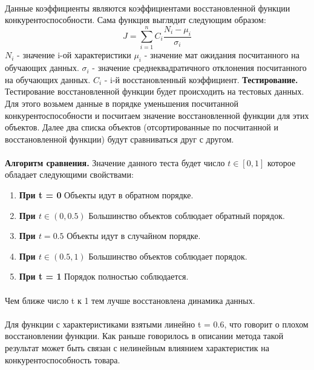 \documentclass[14pt, a4paper]{extarticle}
\begin{document}
\paragraph{}
Данные коэффициенты являются коэффициентами восстановленной функции конкурентоспособности. Сама функция выглядит следующим образом:
\[
  J = \sum_{i=1}^n C_i \frac{N_i - \mu_i}{\sigma_i}
\]
\(N_i\) - значение i-ой характеристики
\newline
\(\mu_i\) - значение мат ожидания посчитанного на обучающих данных.
\newline
\(\sigma_i\) - значение среднеквадратичного отклонения посчитанного на обучающих данных.
\newline
\(C_i\) - i-й восстановленный коэффициент.
\newpage
\textbf{Тестирование.} Тестирование восстановленной функции будет происходить на тестовых данных.
Для этого возьмем данные в порядке уменьшения посчитанной конкурентоспособности и посчитаем значение восстановленной функции для этих объектов.
Далее два списка объектов (отсортированные по посчитанной и восстановленной функции) будут сравниваться друг с другом.
\paragraph{}
\textbf{Алгоритм сравнения.} Значение данного теста будет число $t \in [0, 1]$ которое обладает следующими свойствами:
\begin{enumerate}
  \item\textbf{При t = 0} Объекты идут в обратном порядке.
  \item\textbf{При $t \in (0, 0.5)$} Большинство объектов соблюдает обратный порядок.
  \item\textbf{При $t = 0.5$} Объекты идут в случайном порядке.
  \item\textbf{При $t \in (0.5, 1)$} Большинство объектов соблюдает порядок.
  \item\textbf{При t = 1} Порядок полностью соблюдается.
\end{enumerate}
\paragraph{}
Чем ближе число t к 1 тем лучше восстановлена динамика данных.
\paragraph{}
Для функции с характеристиками взятыми линейно t = 0.6, что говорит о плохом восстановлении функции. Как раньше говорилось в описании метода такой результат может быть связан с нелинейным влиянием характеристик на конкурентоспособность товара.
\newline
\end{document}
